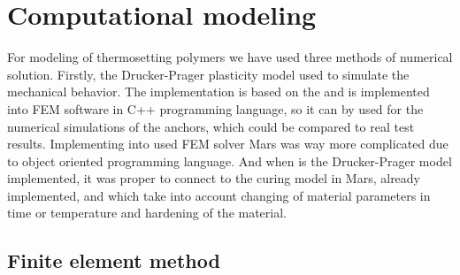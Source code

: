 \thispagestyle{plain}
\section{Computational modeling}
\indent

For modeling of thermosetting polymers we have used three methods of numerical solution. Firstly, the Drucker-Prager plasticity model used to simulate the mechanical behavior. The implementation is based on the \cite{geofem} and is implemented into FEM software in C++ programming language, so it can by used for the numerical simulations of the anchors, which could be compared to real test results. Implementing into used FEM solver Mars \cite{mars} was way more complicated due to object oriented programming language. And when is the Drucker-Prager model implemented, it was proper to connect to the  curing model in Mars, already implemented, and which take into account changing of material parameters in time or temperature and hardening of the material.

\subsection{Finite element method}
\indent

